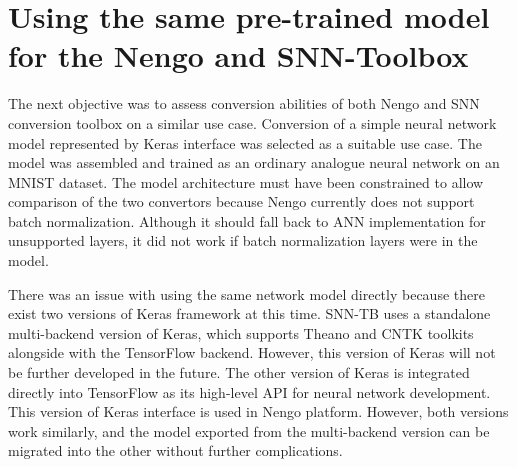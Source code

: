 \section{Using the same pre-trained model for the Nengo and SNN-Toolbox}
The next objective was to assess conversion abilities of both Nengo and SNN conversion toolbox on a similar use case. Conversion of a simple neural network model represented by Keras interface was selected as a suitable use case. The model was assembled and trained as an ordinary analogue neural network on an MNIST dataset. The model architecture must have been constrained to allow comparison of the two convertors because Nengo currently does not support batch normalization. Although it should fall back to ANN implementation for unsupported layers, it did not work if batch normalization layers were in the model.\par
There was an issue with using the same network model directly because there exist two versions of Keras framework at this time. SNN-TB uses a standalone multi-backend version of Keras, which supports Theano and CNTK toolkits alongside with the TensorFlow backend. However, this version of Keras will not be further developed in the future. The other version of Keras is integrated directly into TensorFlow as its high-level API for neural network development. This version of Keras interface is used in Nengo platform. However, both versions work similarly, and the model exported from the multi-backend version can be migrated into the other without further complications.

